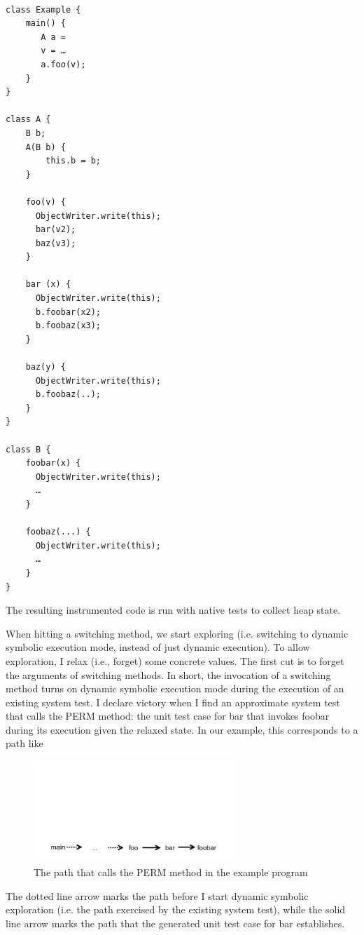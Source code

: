 \begin{lstlisting}[style=JavaStyle, caption=An example Pig Latin program, label=lst:exampleInstrument, frame=none]

class Example {
	main() {
	   A a = 
	   v = …
	   a.foo(v);
	}
}

class A {
	B b;
	A(B b) {
		this.b = b;
	}

	foo(v) {
	  ObjectWriter.write(this);
	  bar(v2);
	  baz(v3);
	}

	bar (x) {
	  ObjectWriter.write(this);
	  b.foobar(x2);
	  b.foobaz(x3);
	}

	baz(y) {
	  ObjectWriter.write(this);
	  b.foobaz(..);
	}
}

class B {
	foobar(x) {
	  ObjectWriter.write(this);
	  …
	}

	foobaz(...) {
	  ObjectWriter.write(this);
	  …
	}
}
\end{lstlisting}


The resulting instrumented code is run with native tests to collect heap state.

  When hitting a switching method, we start exploring (i.e. switching to dynamic symbolic execution mode, instead of just dynamic execution).  To allow exploration, I relax (i.e., forget) some concrete values.  The first cut is to forget the arguments of switching methods.  In short, the invocation of a switching method turns on dynamic symbolic execution mode during the execution of an existing system test.  I declare victory when I find an approximate system test that calls the PERM method: the unit test case for bar that invokes foobar during its execution given the relaxed state.  In our example, this corresponds to a path like 

\begin{figure}[h]
\centering
\includegraphics[width=3in, trim=0in 0in 0in 2.0in, clip]{path.png}
\caption{The path that calls the PERM method in the example program}
\end{figure}

The dotted line arrow marks the path before I start dynamic symbolic exploration (i.e. the path exercised by the existing system test), while the solid line arrow marks the path that the generated unit test case for bar establishes. 

